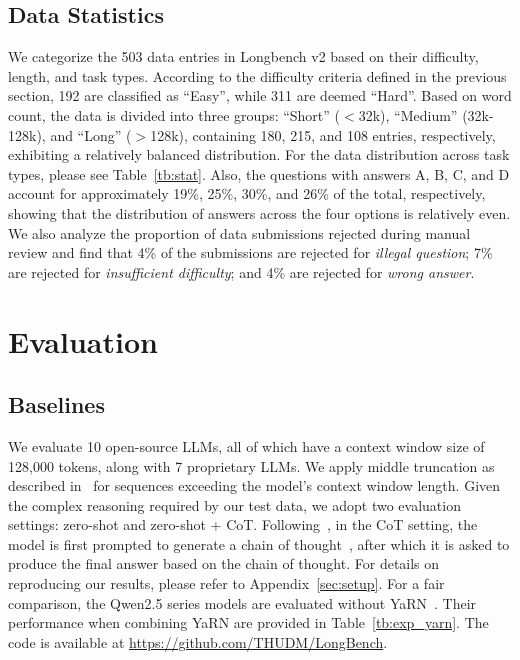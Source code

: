 \subsection{Data Statistics}
We categorize the 503 data entries in Longbench v2 based on their difficulty, length, and task types. According to the difficulty criteria defined in the previous section, 192 are classified as ``Easy'', while 311 are deemed ``Hard''. Based on word count, the data is divided into three groups: ``Short'' ($<$32k), ``Medium'' (32k-128k), and ``Long'' ($>$128k), containing 180, 215, and 108 entries, respectively, exhibiting a relatively balanced distribution.
For the data distribution across task types, please see Table~\ref{tb:stat}.
Also, the questions with answers A, B, C, and D account for approximately 19\%, 25\%, 30\%, and 26\% of the total, respectively, showing that the distribution of answers across the four options is relatively even.
We also analyze the proportion of data submissions rejected during manual review and find that 4\% of the submissions are rejected for \emph{illegal question}; 7\% are rejected for \emph{insufficient difficulty}; and 4\% are rejected for \emph{wrong answer}.
\section{Evaluation}

\subsection{Baselines}

We evaluate 10 open-source LLMs, all of which have a context window size of 128,000 tokens, along with 7 proprietary LLMs.
We apply middle truncation as described in~\citet{bai2024longbench} for sequences exceeding the model's context window length.
Given the complex reasoning required by our test data, we adopt two evaluation settings: zero-shot and zero-shot + CoT. Following~\citet{rein2023gpqa}, in the CoT setting, the model is first prompted to generate a chain of thought~\cite{wei2022chain}, after which it is asked to produce the final answer based on the chain of thought.
For details on reproducing our results, please refer to Appendix~\ref{sec:setup}. 
For a fair comparison, the Qwen2.5 series models are evaluated without YaRN~\cite{peng2024yarn}. Their performance when combining YaRN are provided in Table~\ref{tb:exp_yarn}.
The code is available at \url{https://github.com/THUDM/LongBench}.

